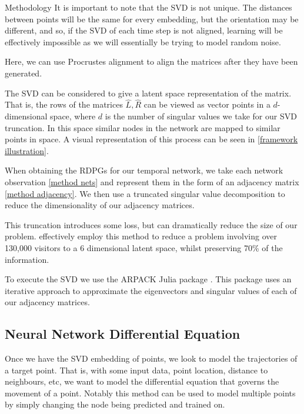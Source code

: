 \documentclass[12pt]{amsart}
\begin{document}
\begin{section}{Methodology}
            It is important to note that the SVD is not unique. The distances between points will be the same for every embedding, but the orientation may be different, and so, if the SVD of each time step is not aligned, learning will be effectively impossible as we will essentially be trying to model random noise. 
            
            Here, we can use Procrustes alignment\cite{DotProductGraphs} to align the matrices after they have been generated.
            
            The SVD can be considered to give a latent space representation of the matrix\cite{hoff2002latent}. That is, the rows of the matrices $\hat L,\hat R$ can be viewed as vector points in a $d$-dimensional space, where $d$ is the number of singular values we take for our SVD truncation. In this space similar nodes in the network are mapped to similar points in space. A visual representation of this process can be seen in \autoref{framework illustration}. 
            
            When obtaining the RDPGs for our temporal network, we take each network observation \autoref{method nets} and represent them in the form of an adjacency matrix \autoref{method adjacency}. We then use a truncated singular value decomposition to reduce the dimensionality of our adjacency matrices\cite{golub1971singular}. 
            
            This truncation introduces some loss, but can dramatically reduce the size of our problem. \cite{Runghen2021} effectively employ this method to reduce a problem involving over 130,000 visitors to a 6 dimensional latent space, whilst preserving 70\% of the information.

            To execute the SVD we use the ARPACK Julia package \cite{lehoucq1998arpack}. This package uses an iterative approach to approximate the eigenvectors and singular values of each of our adjacency matrices\cite{lehoucq1996deflation}.    

    \subsection{Neural Network Differential Equation}
        Once we have the SVD embedding of points, we look to model the trajectories of a target point. That is, with some input data, point location, distance to neighbours, etc, we want to model the differential equation that governs the movement of a point. 
        Notably this method can be used to model multiple points by simply changing the node being predicted and trained on. 
            

\end{section}
\end{document}

